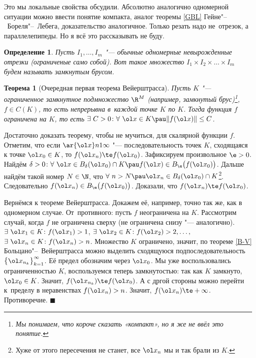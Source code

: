 \documentclass[a4paper,10pt,twoside]{article}
\newtheorem{Def}{Определение}[section]
\newtheorem{The}{Теорема}[section]
\newenvironment{Proof}
       {\par\noindent{\textbf{Доказательство.}}}
       {\hfill$\scriptstyle\blacksquare$}
\begin{document}
	 Это мы локальные свойства обсудили. Абсолютно аналогично одномерной ситуации можно ввести понятие компакта, аналог теоремы \ref{GBL}
	 Гейне"--~Бореля"--~Лебега, доказательство аналогичное. Только резать надо не~отрезок, а параллелепипеды.
	 Но я всё это рассказывать не буду.
	 \begin{Def} Пусть $I_1,\ldots,I_m$ "--- обычные одномерные невырожденные отрезки (ограниченые само собой).
	 Вот такое множество $I_1\times I_2\times\dots\times I_m$ будем называть замкнутым брусом.
	 \end{Def}
	 \begin{The}[Очередная первая теорема Вейерштрасса]
	 Пусть $K$ "--- ограниченное замкнутное подмножество $\R^M$ (например, замкнутый брус)\footnote{Мы понимаем, что короче сказать «компакт», но я же не ввёл это понятие.},
	 $f\in C(K)$, то есть непрерывна в~каждой точке $K$ по $K$.
	 Тогда функция $f$ ограничена на $K$, то есть $\exists\ C>0\colon \forall\ \ol x\in K\pau \|f(\ol x)\|\le C$.
	 \end{The}
	 \begin{Proof}
	 Достаточно доказать теорему, чтобы не мучиться, для скалярной функции $f$. Отметим, что если $\ar {\ol x}n1\infty$ "--- последовательность точек $K$, сходящаяся к точке $\ol x_0\in K$, то
	 $f(\ol x_n)\te f(\ol x_0)$. Зафиксируем произвольное $\e>0$. Найдём $\delta > 0\colon \forall\ \ol x\in B_\delta(\ol x_0)\cap K\pau 
	 f(\ol x)\in B_\e\big(f(\ol x_0)\big)$. Дальше найдём такой номер $N\in\N$, что $\forall\ n > N\pau \ol x_n\in B_\delta(\ol x_0)\cap K$\footnote{Хуже от этого пересечения не станет, все $\ol x_n$ мы и так брали из $K$.}. 
	 Следовательно $f(\ol x_n)\in B_\e\big(f(\ol x_0)\big)$. Доказали, что $f(\ol x_n)\te f(\ol x_0)$.
	 
	 Вернёмся к теореме Вейерштрасса. Докажем её, например, точно так же, как в одномерном случае. От~противного: пусть $f$ неограничена на $K$. Рассмотрим случай, когда $f$ не ограничена сверху (не ограничена снизу "---  аналогично).
	 $\exists\ \ol x_1\in K\colon f(\ol x_1) > 1$, $\exists\ \ol x_2\in K\colon f(\ol x_2) > 2,\ldots,$ $\exists\ \ol x_n\in K\colon f(\ol x_n) > n$.
	 Множество $K$ ограничено, значит, по теореме \ref{B-V} Больцано"--~Вейерштрасса можно выделить сходящуюся подпоследовательность $\big\{\ol x_{n_k}\big\}_{k=1}^\infty$.
	 Её предел обозначим через $\ol x_0$.
	 Мы уже воспользовались ограниченностью $K$, воспользуемся теперь замкнутостью: так как $K$ замкнуто, $\ol x_0\in K$. Значит, $f(\ol x_{n_k})\te f(\ol x_0)$.
	 А с дргой стороны можно перейти к~пределу в неравенствах $f(\ol x_n) > n$. Значит, $f(\ol x_n)\te + \infty$. Противоречие.
	 \end{Proof}
\end{document}
